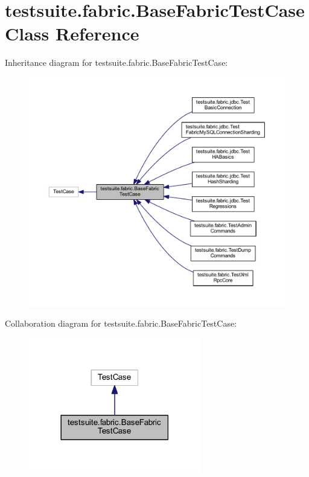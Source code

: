 \hypertarget{classtestsuite_1_1fabric_1_1_base_fabric_test_case}{}\section{testsuite.\+fabric.\+Base\+Fabric\+Test\+Case Class Reference}
\label{classtestsuite_1_1fabric_1_1_base_fabric_test_case}


Inheritance diagram for testsuite.\+fabric.\+Base\+Fabric\+Test\+Case\+:
\nopagebreak
\begin{figure}[H]
\begin{center}
\leavevmode
\includegraphics[width=350pt]{classtestsuite_1_1fabric_1_1_base_fabric_test_case__inherit__graph}
\end{center}
\end{figure}


Collaboration diagram for testsuite.\+fabric.\+Base\+Fabric\+Test\+Case\+:
\nopagebreak
\begin{figure}[H]
\begin{center}
\leavevmode
\includegraphics[width=213pt]{classtestsuite_1_1fabric_1_1_base_fabric_test_case__coll__graph}
\end{center}
\end{figure}
